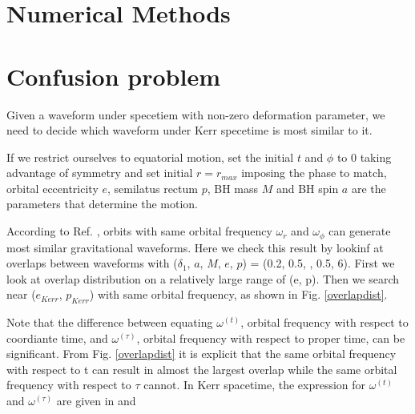 \documentclass{article}
\begin{document}
\section{Numerical Methods}
\section{Confusion problem}

Given a waveform under specetiem with non-zero deformation parameter, we need to decide which waveform under Kerr specetime is most similar to it.

If we restrict ourselves to equatorial motion, set the initial $t$ and $\phi$ to 0 taking advantage of symmetry and set initial $r=r_{max}$ imposing the phase to match, orbital eccentricity $e$, semilatus rectum $p$, BH mass $M$ and BH spin $a$ are the parameters that determine the motion.

According to Ref. \cite{sameOmg}, orbits with same orbital frequency $\omega_r$ and $\omega_\phi$ can generate most similar gravitational waveforms. Here we check this result by lookinf at overlaps between waveforms with ($\delta_1,\, a,\, M,\, e,\, p$) = (0.2, 0.5, , 0.5, 6). First we look at overlap distribution on a relatively large range of (e, p). Then we search near ($e_{Kerr}$, $p_{Kerr}$) with same orbital frequency, as shown in Fig. \ref{overlapdist}. 

Note that the difference between equating $\omega^{(t)}$, orbital frequency with respect to coordiante time, and $\omega^{(\tau)}$, orbital frequency with respect to proper time, can be significant. From Fig. \ref{overlapdist} it is explicit that the same orbital frequency with respect to t can result in almost the largest overlap while the same orbital frequency with respect to $\tau$ cannot. In Kerr spacetime, the expression for $\omega^{(t)}$ and $\omega^{(\tau)}$ are given in \cite{tOmg} and \cite{tauOmg} 
\end{document}
